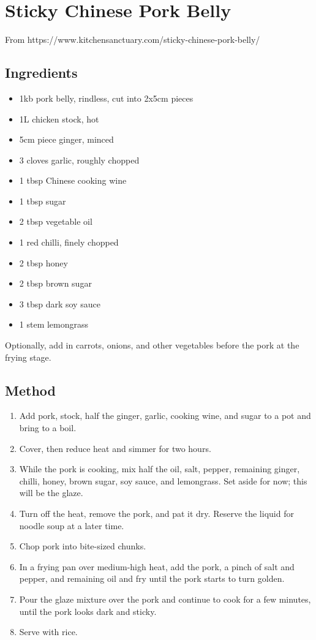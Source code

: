\section{Sticky Chinese Pork Belly}


From https://www.kitchensanctuary.com/sticky-chinese-pork-belly/

\subsection{Ingredients}

\begin{itemize}
	\item 1kb pork belly, rindless, cut into 2x5cm pieces
	\item 1L chicken stock, hot
	\item 5cm piece ginger, minced
	\item 3 cloves garlic, roughly chopped
	\item 1 tbsp Chinese cooking wine
	\item 1 tbsp sugar
	\item 2 tbsp vegetable oil
	\item 1 red chilli, finely chopped
	\item 2 tbsp honey
	\item 2 tbsp brown sugar
	\item 3 tbsp dark soy sauce
	\item 1 stem lemongrass
\end{itemize}

Optionally, add in carrots, onions, and other vegetables before the pork at the frying stage.

\subsection{Method}

\begin{enumerate}
	\item Add pork, stock, half the ginger, garlic, cooking wine, and sugar to a pot and bring to a boil.
	\item Cover, then reduce heat and simmer for two hours.
	\item While the pork is cooking, mix half the oil, salt, pepper, remaining ginger, chilli, honey, brown sugar, soy sauce, and lemongrass. Set aside for now; this will be the glaze.
	\item Turn off the heat, remove the pork, and pat it dry. Reserve the liquid for noodle soup at a later time.
	\item Chop pork into bite-sized chunks.
	\item In a frying pan over medium-high heat, add the pork, a pinch of salt and pepper, and remaining oil and fry until the pork starts to turn golden.
	\item Pour the glaze mixture over the pork and continue to cook for a few minutes, until the pork looks dark and sticky.
	\item Serve with rice.
\end{enumerate}
